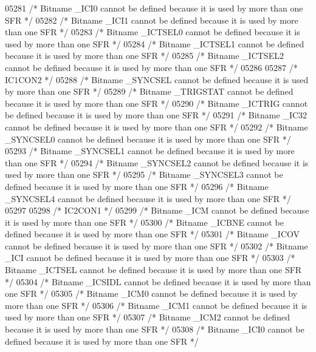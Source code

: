 \begin{DoxyCode}
05281 \textcolor{comment}{/* Bitname \_ICI0 cannot be defined because it is used by more than one SFR */}
05282 \textcolor{comment}{/* Bitname \_ICI1 cannot be defined because it is used by more than one SFR */}
05283 \textcolor{comment}{/* Bitname \_ICTSEL0 cannot be defined because it is used by more than one SFR */}
05284 \textcolor{comment}{/* Bitname \_ICTSEL1 cannot be defined because it is used by more than one SFR */}
05285 \textcolor{comment}{/* Bitname \_ICTSEL2 cannot be defined because it is used by more than one SFR */}
05286 
05287 \textcolor{comment}{/* IC1CON2 */}
05288 \textcolor{comment}{/* Bitname \_SYNCSEL cannot be defined because it is used by more than one SFR */}
05289 \textcolor{comment}{/* Bitname \_TRIGSTAT cannot be defined because it is used by more than one SFR */}
05290 \textcolor{comment}{/* Bitname \_ICTRIG cannot be defined because it is used by more than one SFR */}
05291 \textcolor{comment}{/* Bitname \_IC32 cannot be defined because it is used by more than one SFR */}
05292 \textcolor{comment}{/* Bitname \_SYNCSEL0 cannot be defined because it is used by more than one SFR */}
05293 \textcolor{comment}{/* Bitname \_SYNCSEL1 cannot be defined because it is used by more than one SFR */}
05294 \textcolor{comment}{/* Bitname \_SYNCSEL2 cannot be defined because it is used by more than one SFR */}
05295 \textcolor{comment}{/* Bitname \_SYNCSEL3 cannot be defined because it is used by more than one SFR */}
05296 \textcolor{comment}{/* Bitname \_SYNCSEL4 cannot be defined because it is used by more than one SFR */}
05297 
05298 \textcolor{comment}{/* IC2CON1 */}
05299 \textcolor{comment}{/* Bitname \_ICM cannot be defined because it is used by more than one SFR */}
05300 \textcolor{comment}{/* Bitname \_ICBNE cannot be defined because it is used by more than one SFR */}
05301 \textcolor{comment}{/* Bitname \_ICOV cannot be defined because it is used by more than one SFR */}
05302 \textcolor{comment}{/* Bitname \_ICI cannot be defined because it is used by more than one SFR */}
05303 \textcolor{comment}{/* Bitname \_ICTSEL cannot be defined because it is used by more than one SFR */}
05304 \textcolor{comment}{/* Bitname \_ICSIDL cannot be defined because it is used by more than one SFR */}
05305 \textcolor{comment}{/* Bitname \_ICM0 cannot be defined because it is used by more than one SFR */}
05306 \textcolor{comment}{/* Bitname \_ICM1 cannot be defined because it is used by more than one SFR */}
05307 \textcolor{comment}{/* Bitname \_ICM2 cannot be defined because it is used by more than one SFR */}
05308 \textcolor{comment}{/* Bitname \_ICI0 cannot be defined because it is used by more than one SFR */}

\end{DoxyCode}
